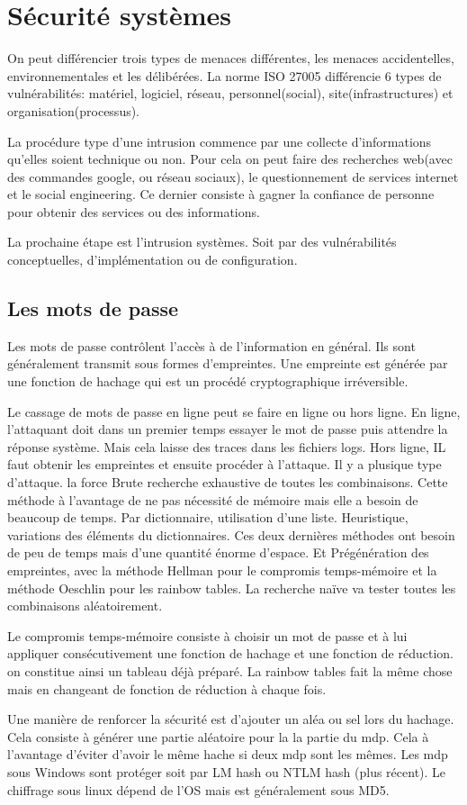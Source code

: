 \documentclass{article}
\begin{document}
\section{Sécurité systèmes}
On peut différencier trois types de menaces différentes, les menaces accidentelles, environnementales et les délibérées. La norme ISO 27005 différencie 6 types de vulnérabilités: matériel, logiciel, réseau, personnel(social), site(infrastructures) et organisation(processus). 

La procédure type d'une intrusion commence par une collecte d'informations qu'elles soient technique ou non. Pour cela on peut faire des recherches web(avec des commandes google, ou réseau sociaux), le questionnement de services internet et le social engineering. Ce dernier consiste à gagner la confiance de personne pour obtenir des services ou des informations. 

La prochaine étape est l'intrusion systèmes. Soit par des vulnérabilités conceptuelles, d'implémentation ou de configuration. 
\subsection{Les mots de passe}
Les mots de passe contrôlent l'accès à de l'information en général. Ils sont généralement transmit sous formes d'empreintes. Une empreinte est générée par une fonction de hachage qui est un procédé cryptographique irréversible.

Le cassage de mots de passe en ligne peut se faire en ligne ou hors ligne. En ligne, l'attaquant doit dans un premier temps essayer le mot de passe puis attendre la réponse système. Mais cela laisse des traces dans les fichiers logs. Hors ligne, IL faut obtenir les empreintes et ensuite procéder à l'attaque. 
Il y a plusique type d'attaque. la force Brute recherche exhaustive de toutes les combinaisons. Cette méthode à l'avantage de ne pas nécessité de mémoire mais elle a besoin de beaucoup de temps. Par dictionnaire, utilisation d'une liste. Heuristique, variations des éléments du dictionnaires. Ces deux dernières méthodes ont besoin de peu de temps mais d'une quantité énorme d'espace. Et Prégénération des empreintes, avec la méthode Hellman pour le compromis temps-mémoire et la méthode Oeschlin pour les rainbow tables. La recherche naïve va tester toutes les combinaisons aléatoirement. 

Le compromis temps-mémoire consiste à choisir un mot de passe et à lui appliquer consécutivement une fonction de hachage et une fonction de réduction. on constitue ainsi un tableau
déjà préparé. 
La rainbow tables fait la même chose mais en changeant de fonction de réduction à chaque fois. 

Une manière de renforcer la sécurité est d'ajouter un aléa ou sel lors du hachage. Cela consiste à générer une partie aléatoire pour la la partie du mdp. Cela à l'avantage d'éviter d'avoir le même hache si deux mdp sont les mêmes. 
Les mdp sous Windows sont protéger soit par LM hash ou NTLM hash (plus récent). Le chiffrage sous linux dépend de l'OS mais est généralement sous MD5. 
\end{document}
